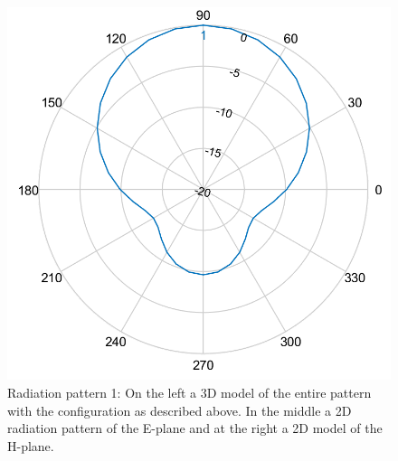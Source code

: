 \begin{figure}[!htb]
  \includegraphics[width=\linewidth]{../images/pattern2/hp.png}
\endminipage
  \caption{Radiation pattern 1: On the left a 3D model of the entire pattern with the configuration as described above. In the middle a 2D radiation pattern of the E-plane and at the right a 2D model of the H-plane.}
  \label{radpattern2}
\end{figure}

